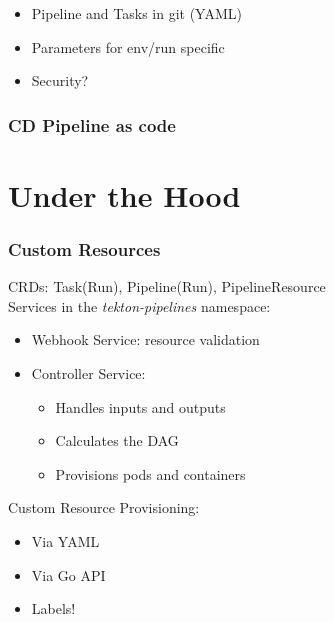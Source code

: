 \documentclass[aspectratio=169,11pt,hyperref={colorlinks=true}]{beamer}
\begin{document}
\begin{lblackrwhiteframe}
\begin{blackframe}
\begin{2columnsframe}
  {
  \begin{itemize}
    \item Pipeline and Tasks in git (YAML)
    \item Parameters for env/run specific
    \item Security?
  \end{itemize}
  \vspace{3ex}
  
  }
  {
  
  \vspace{1ex}
  
  }
  \frametitle{CD Pipeline as code}
\end{2columnsframe}

\section{Under the Hood}

\begin{grayframe}
  \frametitle{Custom Resources}
  CRDs: Task(Run), Pipeline(Run), PipelineResource \\
  \vspace{3ex}
  Services in the {\em tekton-pipelines} namespace:
  \begin{itemize}
    \item Webhook Service: resource validation
    \item Controller Service:
    \begin{itemize}
      \item Handles inputs and outputs
      \item Calculates the DAG
      \item Provisions pods and containers
    \end{itemize}
  \end{itemize}
  \vspace{3ex}
  Custom Resource Provisioning:
  \begin{itemize}
    \item Via YAML
    \item Via Go API
    \item Labels!
  \end{itemize}
\end{grayframe}


\end{blackframe}
\end{lblackrwhiteframe}
\end{document}
